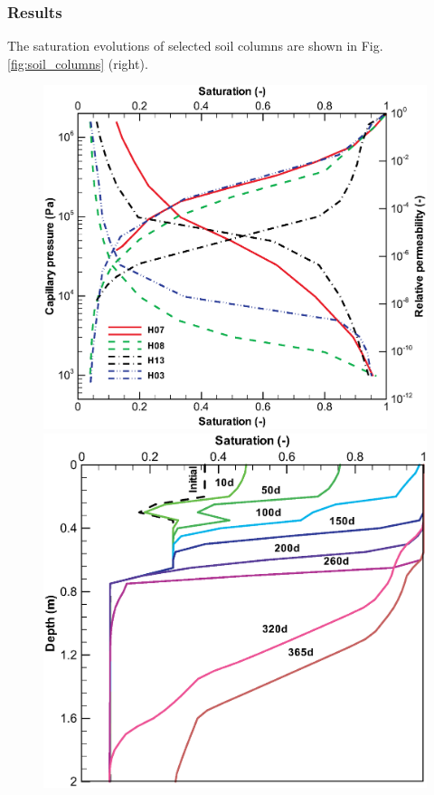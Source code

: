 \subsubsection*{Results}
The saturation evolutions of selected soil columns are shown in
Fig. \ref{fig:soil_columns} (right).
%
\begin{figure}[htb!]
  \begin{center}
    \begin{minipage}[t]{0.45\textwidth}
      \begin{center}
        \includegraphics[scale=0.27]{H_US/figures/Soil_P1.eps}
      \end{center}
    \end{minipage}
    \begin{minipage}[t]{0.45\textwidth}
      \begin{center}
        \includegraphics[scale=0.27]{H_US/figures/pl1_s.eps}

\end{center}
\end{minipage}
\end{center}
\end{figure}
